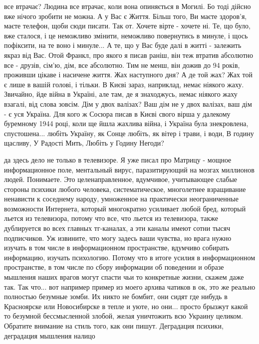 
все втрачає? Людина все втрачає, коли вона опиняється в Могилі. Бо тоді дійсно
вже нічого зробити не можна. А у Вас є Життя. Більш того, Ви маєте здоров'я,
маєте телефон, щоби сюди писати. Так от. Хочете вірте - хочете ні. Те, що було,
вже сталося, і це неможливо змінити, неможливо повернутись в минуле, і щось
пофіксити, на те воно і минуле... А те, що у Вас буде далі в житті - залежить
якраз від Вас. Отой Франкл, про якого я писав раніш, він теж втратив абсолютно
все - друзів, сім'ю, дім, все абсолютно. Тим не менш, він дожив до 94 років,
проживши цікаве і насичене життя. Жах наступного дня? А де той жах? Жах той є
лише в вашій голові, і тільки. В Києві зараз, наприклад, немає ніякого жаху.
Звичайно, йде війна в Україні, але там, де я знаходжусь, немає ніякого жаху
взагалі, від слова зовсім. Дім у двох валізах? Ваш дім не у двох валізах, ваш
дім - є уся Україна. Для кого ж Сосюра писав в Києві свого вірша у далекому
буремному 1944 році, коли ще йшла жахлива війна, і Україна була знекровлена,
спустошена... любіть Україну, як Сонце любіть, як вітер і трави, і води, В
годину щасливу, У Радості Мить, Любіть у Годину Негоди?

да здесь дело не только в телевизоре. Я уже писал про Матрицу - мощное
информационное поле, ментальный вирус, паразитирующий на мозгах миллионов
людей. Понимаете. Это целенаправленное, вдумчивое, учитывающее слабые стороны
психики любого человека, систематическое, многолетнее взращивание ненависти к
соседнему народу, умноженное на практически неограниченные возможности
Интернета,  который многократно усиливает любой бред, который льется из
телевизора, потому что все, что льется из телевизора, также дублируется во всех
главных тг-каналах, а эти каналы имеют сотни тысяч подписчиков. Уж извините,
что могу задесь ваши чувства, но врага нужно изучать в том числе в
информационном пространстве, вдумчиво собирать информацию, изучать психологию.
Потому что в итоге усилия в информационном пространстве, в том числе по сбору
информации об поведении и образе мышления наших врагов могут спасти чьи то
конкретные жизни, скажем даже так. Так что... вот например пример из моего
архива чатиков в ок, это же реально полностью безумные зомби. Их никто не
бомбит, они сидят где нибудь в Красноярске или Новосибирске в тепле и уюте, но
они... просто брызжут какой то безумной бессмысленной злобой, желая уничтожить
всю Украину целиком. Обратите внимание  на стиль того, как они пишут.
Деградация психики, деградация мышления налицо
